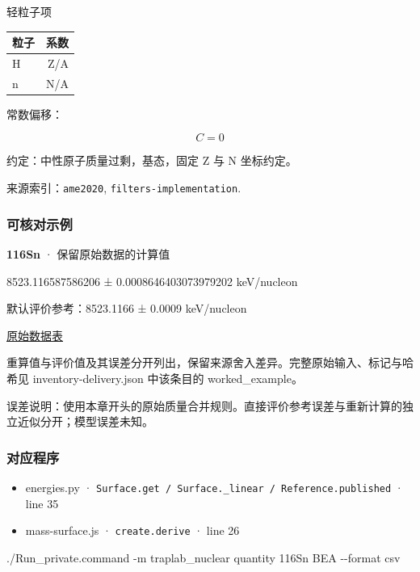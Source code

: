 \documentclass[
  11pt,
  letterpaper,
]{article}
\newenvironment{Shaded}{}{}
\newcommand{\AttributeTok}[1]{\textcolor[rgb]{0.49,0.56,0.16}{#1}}
\newcommand{\ExtensionTok}[1]{#1}
\newcommand{\NormalTok}[1]{#1}
\providecommand{\tightlist}{%
  \setlength{\itemsep}{0pt}\setlength{\parskip}{0pt}}
\begin{document}
轻粒子项

\begin{longtable}[]{@{}lr@{}}
\toprule\noalign{}
粒子 & 系数 \\
\midrule\noalign{}
\endhead
\bottomrule\noalign{}
\endlastfoot
H & Z/A \\
n & N/A \\
\end{longtable}

常数偏移：

\[
C=0
\]

约定：中性原子质量过剩，基态，固定 Z 与 N 坐标约定。

来源索引：\texttt{ame2020}, \texttt{filters-implementation}.

\subsubsection{可核对示例}\label{ux53efux6838ux5bf9ux793aux4f8b-2}

\textbf{116Sn} · 保留原始数据的计算值

8523.116587586206 ± 0.0008646403073979202 keV/nucleon

默认评价参考：8523.1166 ± 0.0009 keV/nucleon

\href{https://www-nds.iaea.org/amdc/ame2020/mass_1.mas20.txt}{原始数据表}

重算值与评价值及其误差分开列出，保留来源舍入差异。完整原始输入、标记与哈希见
inventory-delivery.json 中该条目的 worked\_example。

误差说明：使用本章开头的原始质量合并规则。直接评价参考误差与重新计算的独立近似分开；模型误差未知。

\subsubsection{对应程序}\label{ux5bf9ux5e94ux7a0bux5e8f-2}

\begin{itemize}
\tightlist
\item
  energies.py ·
  \texttt{Surface.get\ /\ Surface.\_linear\ /\ Reference.published} ·
  line 35
\item
  mass-surface.js · \texttt{create.derive} · line 26
\end{itemize}

\begin{Shaded}
\begin{Highlighting}[]
\ExtensionTok{./Run\_private.command} \AttributeTok{{-}m}\NormalTok{ traplab\_nuclear quantity 116Sn BEA }\AttributeTok{{-}{-}format}\NormalTok{ csv}
\end{Highlighting}
\end{Shaded}
\end{document}
